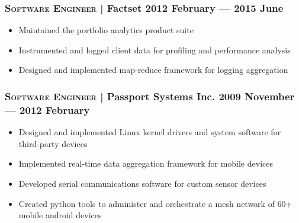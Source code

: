 \documentclass[letterpaper,10pt]{article}
\begin{document}


\subsubsection*{\textsc{Software Engineer} | Factset \hfill 2012 February --- 2015 June}

\begin{itemize}

\item
  Maintained the portfolio analytics product suite
\item
  Instrumented and logged client data for profiling and performance analysis
\item
  Designed and implemented map-reduce framework for logging aggregation

\end{itemize}


\subsubsection*{\textsc{Software Engineer} | Passport Systems Inc. \hfill 2009 November --- 2012 February}

\begin{itemize}

\item
  Designed and implemented Linux kernel drivers and system software for
  third-party devices
\item
  Implemented real-time data aggregation framework for mobile devices
\item
  Developed serial communications software for custom sensor devices
\item
  Created python tools to administer and orchestrate a mesh network of 60+
  mobile android devices

\end{itemize}


\end{document}
